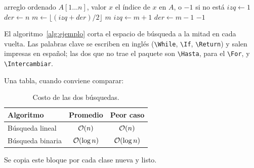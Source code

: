 \begin{algorithm}[htbp]
  \caption{Búsqueda binaria}
  \label{alg:ejemplo}
  \begin{algorithmic}[1]
    \Require arreglo ordenado $A[1 \ldots n]$, valor $x$
    \Ensure el índice de $x$ en $A$, o $-1$ si no está
      \State $\mathit{izq} \gets 1$
      \State $\mathit{der} \gets n$
        \State $m \gets \lfloor (\mathit{izq} + \mathit{der}) / 2
               \rfloor$ 
          \State \Return $m$
          \State $\mathit{izq} \gets m + 1$
        \Else
          \State $\mathit{der} \gets m - 1$
        \EndIf
      \EndWhile
      \State \Return $-1$
    \EndProcedure
  \end{algorithmic}
\end{algorithm}

El algoritmo~\ref{alg:ejemplo} corta el espacio de búsqueda a la mitad
en cada vuelta. Las palabras clave se escriben en inglés
(\verb|\While|, \verb|\If|, \verb|\Return|) y salen impresas en
español; las dos que no trae el paquete son \verb|\Hasta|, para el
\verb|\For|, y \verb|\Intercambiar|.

Una tabla, cuando conviene comparar:

\begin{table}[htbp]
  \centering
  \begin{tabular}{lcc}
    \toprule
    \textbf{Algoritmo} & \textbf{Promedio} & \textbf{Peor caso} \\
    \midrule
    Búsqueda lineal   & $\mathcal{O}\!\left(n\right)$        & $\mathcal{O}\!\left(n\right)$   \\
    Búsqueda binaria  & $\mathcal{O}\!\left(\log n\right)$   & $\mathcal{O}\!\left(\log n\right)$ \\
    \bottomrule
  \end{tabular}
  \caption{Costo de las dos búsquedas.}
  \label{tab:ejemplo}
\end{table}

%



Se copia este bloque por cada clase nueva y listo.



